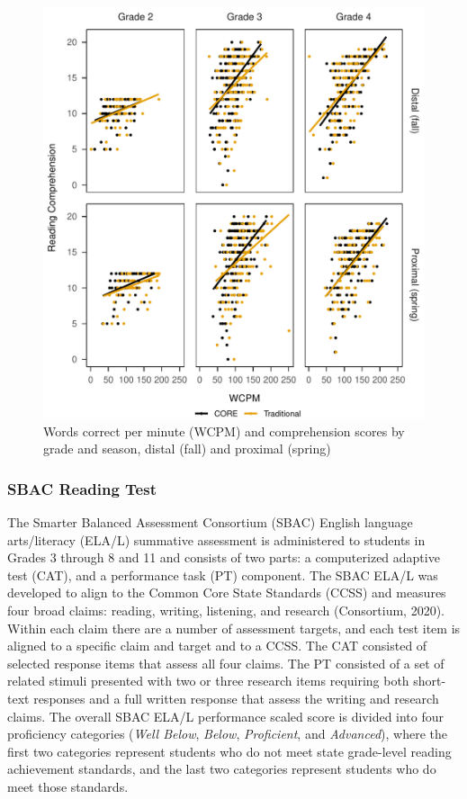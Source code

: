 \documentclass[
  english,
  man, fleqn, noextraspace]{apa6}
\begin{document}
\begin{figure}
\centering
\includegraphics{conseq_validity_manusript_files/figure-latex/fig-comp-scatter-1.pdf}
\caption{\label{fig:fig-comp-scatter}Words correct per minute (WCPM) and comprehension scores by grade and season, distal (fall) and proximal (spring)}
\end{figure}

\hypertarget{sbac-reading-test}{%
\subsubsection{SBAC Reading Test}\label{sbac-reading-test}}

The Smarter Balanced Assessment Consortium (SBAC) English language arts/literacy (ELA/L) summative assessment is administered to students in Grades 3 through 8 and 11 and consists of two parts: a computerized adaptive test (CAT), and a performance task (PT) component. The SBAC ELA/L was developed to align to the Common Core State Standards (CCSS) and measures four broad claims: reading, writing, listening, and research (Consortium, 2020). Within each claim there are a number of assessment targets, and each test item is aligned to a specific claim and target and to a CCSS. The CAT consisted of selected response items that assess all four claims. The PT consisted of a set of related stimuli presented with two or three research items requiring both short-text responses and a full written response that assess the writing and research claims. The overall SBAC ELA/L performance scaled score is divided into four proficiency categories (\emph{Well Below}, \emph{Below}, \emph{Proficient}, and \emph{Advanced}), where the first two categories represent students who do not meet state grade-level reading achievement standards, and the last two categories represent students who do meet those standards.
\end{document}

